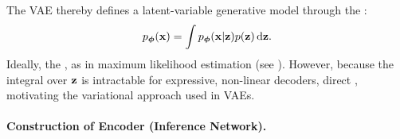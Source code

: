 The VAE thereby defines a latent-variable generative model through the :
\[
p_{\bm{\phi}}({\mathbf{x}}) = \int p_{\bm{\phi}}({\mathbf{x}}|{\mathbf{z}}) p({\mathbf{z}}) \mathop{}\!\mathrm{d} {\mathbf{z}}.
\]
Ideally, the , as in maximum likelihood estimation (see ). 
However, because the integral over ${\mathbf{z}}$ is intractable for expressive, non-linear 
decoders, direct , motivating the variational 
approach used in VAEs.




\paragraph{Construction of Encoder (Inference Network).}



